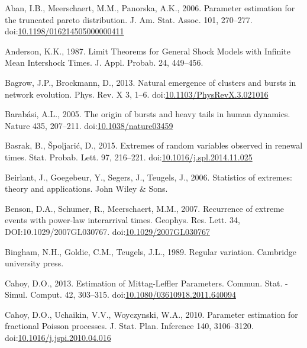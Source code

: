 \documentclass[]{elsarticle} %
\begin{document}
\hypertarget{refs}{}
\leavevmode\hypertarget{ref-Aban06}{}%
Aban, I.B., Meerschaert, M.M., Panorska, A.K., 2006. Parameter
estimation for the truncated pareto distribution. J. Am. Stat. Assoc.
101, 270--277.
doi:\href{https://doi.org/10.1198/016214505000000411}{10.1198/016214505000000411}

\leavevmode\hypertarget{ref-Anderson1987}{}%
Anderson, K.K., 1987. Limit Theorems for General Shock Models with
Infinite Mean Intershock Times. J. Appl. Probab. 24, 449--456.

\leavevmode\hypertarget{ref-Bagrow2013}{}%
Bagrow, J.P., Brockmann, D., 2013. Natural emergence of clusters and
bursts in network evolution. Phys. Rev. X 3, 1--6.
doi:\href{https://doi.org/10.1103/PhysRevX.3.021016}{10.1103/PhysRevX.3.021016}

\leavevmode\hypertarget{ref-Barabasi2005}{}%
Barabási, A.L., 2005. The origin of bursts and heavy tails in human
dynamics. Nature 435, 207--211.
doi:\href{https://doi.org/10.1038/nature03459}{10.1038/nature03459}

\leavevmode\hypertarget{ref-Basrak2014}{}%
Basrak, B., Špoljarić, D., 2015. Extremes of random variables observed
in renewal times. Stat. Probab. Lett. 97, 216--221.
doi:\href{https://doi.org/10.1016/j.spl.2014.11.025}{10.1016/j.spl.2014.11.025}

\leavevmode\hypertarget{ref-beirlantBook}{}%
Beirlant, J., Goegebeur, Y., Segers, J., Teugels, J., 2006. Statistics
of extremes: theory and applications. John Wiley \& Sons.

\leavevmode\hypertarget{ref-Benson2007}{}%
Benson, D.A., Schumer, R., Meerschaert, M.M., 2007. Recurrence of
extreme events with power-law interarrival times. Geophys. Res. Lett.
34, DOI:10.1029/2007GL030767.
doi:\href{https://doi.org/10.1029/2007GL030767}{10.1029/2007GL030767}

\leavevmode\hypertarget{ref-BinghamGoldieTeugels}{}%
Bingham, N.H., Goldie, C.M., Teugels, J.L., 1989. Regular variation.
Cambridge university press.

\leavevmode\hypertarget{ref-Cahoy2013}{}%
Cahoy, D.O., 2013. Estimation of Mittag-Leffler Parameters. Commun.
Stat. - Simul. Comput. 42, 303--315.
doi:\href{https://doi.org/10.1080/03610918.2011.640094}{10.1080/03610918.2011.640094}

\leavevmode\hypertarget{ref-Cahoy2010}{}%
Cahoy, D.O., Uchaikin, V.V., Woyczynski, W.A., 2010. Parameter
estimation for fractional Poisson processes. J. Stat. Plan. Inference
140, 3106--3120.
doi:\href{https://doi.org/10.1016/j.jspi.2010.04.016}{10.1016/j.jspi.2010.04.016}
\end{document}
